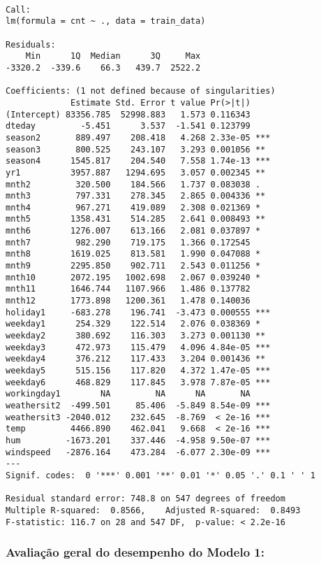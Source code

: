 \documentclass[
  letterpaper,
  DIV=11,
  numbers=noendperiod]{scrartcl}
\begin{document}
\begin{verbatim}

Call:
lm(formula = cnt ~ ., data = train_data)

Residuals:
    Min      1Q  Median      3Q     Max 
-3320.2  -339.6    66.3   439.7  2522.2 

Coefficients: (1 not defined because of singularities)
             Estimate Std. Error t value Pr(>|t|)    
(Intercept) 83356.785  52998.883   1.573 0.116343    
dteday         -5.451      3.537  -1.541 0.123799    
season2       889.497    208.418   4.268 2.33e-05 ***
season3       800.525    243.107   3.293 0.001056 ** 
season4      1545.817    204.540   7.558 1.74e-13 ***
yr1          3957.887   1294.695   3.057 0.002345 ** 
mnth2         320.500    184.566   1.737 0.083038 .  
mnth3         797.331    278.345   2.865 0.004336 ** 
mnth4         967.271    419.089   2.308 0.021369 *  
mnth5        1358.431    514.285   2.641 0.008493 ** 
mnth6        1276.007    613.166   2.081 0.037897 *  
mnth7         982.290    719.175   1.366 0.172545    
mnth8        1619.025    813.581   1.990 0.047088 *  
mnth9        2295.850    902.711   2.543 0.011256 *  
mnth10       2072.195   1002.698   2.067 0.039240 *  
mnth11       1646.744   1107.966   1.486 0.137782    
mnth12       1773.898   1200.361   1.478 0.140036    
holiday1     -683.278    196.741  -3.473 0.000555 ***
weekday1      254.329    122.514   2.076 0.038369 *  
weekday2      380.692    116.303   3.273 0.001130 ** 
weekday3      472.973    115.479   4.096 4.84e-05 ***
weekday4      376.212    117.433   3.204 0.001436 ** 
weekday5      515.156    117.820   4.372 1.47e-05 ***
weekday6      468.829    117.845   3.978 7.87e-05 ***
workingday1        NA         NA      NA       NA    
weathersit2  -499.501     85.406  -5.849 8.54e-09 ***
weathersit3 -2040.012    232.645  -8.769  < 2e-16 ***
temp         4466.890    462.041   9.668  < 2e-16 ***
hum         -1673.201    337.446  -4.958 9.50e-07 ***
windspeed   -2876.164    473.284  -6.077 2.30e-09 ***
---
Signif. codes:  0 '***' 0.001 '**' 0.01 '*' 0.05 '.' 0.1 ' ' 1

Residual standard error: 748.8 on 547 degrees of freedom
Multiple R-squared:  0.8566,    Adjusted R-squared:  0.8493 
F-statistic: 116.7 on 28 and 547 DF,  p-value: < 2.2e-16
\end{verbatim}

\subsubsection{Avaliação geral do desempenho do Modelo
1:}\label{avaliauxe7uxe3o-geral-do-desempenho-do-modelo-1}
\end{document}
